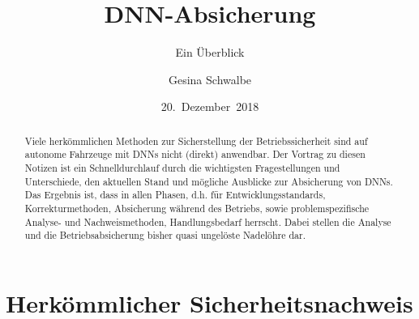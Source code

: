 %
%

\usepackage{fontspec}
\usepackage{lmodern}
\usepackage[shorthands=off]{babel}
\usepackage{csquotes}
\usepackage{graphicx}
\graphicspath{{./images/}}
\usepackage{booktabs}

\usepackage[backend=biber,
style=numeric,
doi=false
]{biblatex}
\renewcommand*{\bibfont}{\tiny}



\title{DNN-Absicherung}
\subtitle{Ein Überblick}
\author{Gesina Schwalbe}
\date{20.~Dezember~2018}



\frame{\maketitle}
\frame{\tableofcontents[hideallsubsections]}

\enlargethispage{2eM}
\begin{abstract}
Viele herkömmlichen Methoden zur Sicherstellung der Betriebssicherheit
sind auf autonome Fahrzeuge mit DNNs nicht (direkt) anwendbar.
Der Vortrag zu diesen Notizen ist ein Schnelldurchlauf durch die
wichtigsten Fragestellungen und Unterschiede, den aktuellen Stand und
mögliche Ausblicke zur Absicherung von DNNs.
Das Ergebnis ist, dass in allen Phasen, d.h. für Entwicklungsstandards,
Korrekturmethoden, Absicherung während des Betriebs, sowie
problemspezifische Analyse- und Nachweismethoden, Handlungsbedarf
herrscht. Dabei stellen die Analyse und die Betriebsabsicherung
bisher quasi ungelöste Nadelöhre dar.
\end{abstract}


\section{Herkömmlicher Sicherheitsnachweis}

